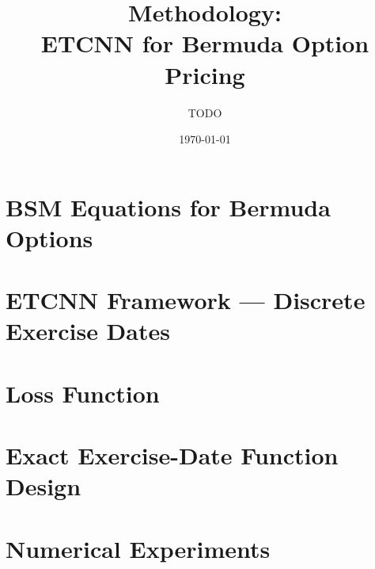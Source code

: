 \documentclass[11pt,a4paper]{article}
\title{Methodology:\\
ETCNN for Bermuda Option Pricing}
\author{TODO}
\date{\today}
\begin{document}
\maketitle

\section{BSM Equations for Bermuda Options}


\section{ETCNN Framework — Discrete Exercise Dates}


\section{Loss Function}


\section{Exact Exercise-Date Function Design}


\section{Numerical Experiments}

\end{document}
